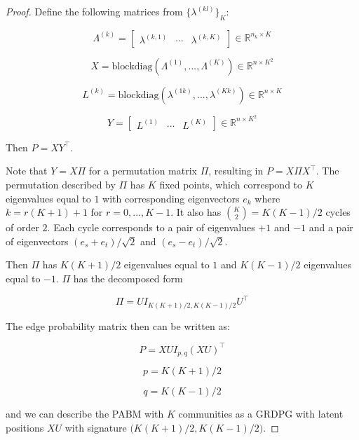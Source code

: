 \documentclass[
  11pt,
]{article}
\begin{document}
\begin{proof}
Define the following matrices from $\{\lambda^{(kl)}\}_K$: 

$$\Lambda^{(k)} = 
\begin{bmatrix} \lambda^{(k,1)} & \cdots & \lambda^{(k, K)} \end{bmatrix}
\in \mathbb{R}^{n_k \times K}$$

\begin{equation} \label{eq:xy}
X = \text{blockdiag}(\Lambda^{(1)}, ..., \Lambda^{(K)}) \in \mathbb{R}^{n \times K^2}
\end{equation}

$$L^{(k)} = \text{blockdiag}(\lambda^{(1k)}, ..., \lambda^{(Kk)}) \in 
\mathbb{R}^{n \times K}$$

$$Y = \begin{bmatrix} L^{(1)} & \cdots & L^{(K)} \end{bmatrix} \in 
\mathbb{R}^{n \times K^2}$$

Then $P = X Y^\top$.

Note that $Y = X \Pi$ for a permutation matrix
$\Pi$, resulting in $P = X \Pi X^\top$.  
The permutation described by $\Pi$ has $K$ fixed points, which correspond to 
$K$ eigenvalues equal to $1$ with corresponding eigenvectors $e_k$ where 
$k = r (K + 1) + 1$ for $r = 0, ..., K - 1$. It also has 
$\binom{K}{2} = K (K - 1) / 2$ cycles of order $2$. Each cycle corresponds to 
a pair of eigenvalues $+1$ and $-1$ and a pair of eigenvectors 
$(e_s + e_t) / \sqrt{2}$ and $(e_s - e_t) / \sqrt{2}$.

Then $\Pi$ has $K (K + 1) / 2$ eigenvalues equal to $1$ and $K (K - 1) / 2$ 
eigenvalues equal to $-1$. $\Pi$ has the decomposed form 

\begin{equation} \label{eq:permutation}
\Pi = U I_{K (K + 1) / 2, K (K - 1) / 2} U^\top
\end{equation}

The edge probability matrix then can be written as:

\begin{equation} \label{eq:pabm-grdpg}
P = X U I_{p, q} (X U)^\top
\end{equation}

\begin{equation} \label{eq:p}
p = K (K + 1) / 2
\end{equation}

\begin{equation} \label{eq:q}
q = K (K - 1) / 2
\end{equation}

and we can describe the PABM with $K$ communities as a GRDPG with latent 
positions $X U$ with signature $\big( K (K + 1) / 2, K (K - 1) / 2 \big)$.
\end{proof}
\end{document}
